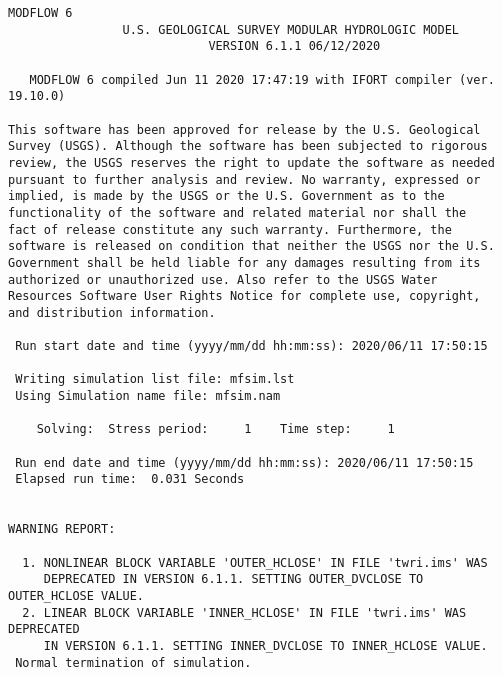 {\small
\begin{lstlisting}[style=modeloutput]
                                   MODFLOW 6
                U.S. GEOLOGICAL SURVEY MODULAR HYDROLOGIC MODEL
                            VERSION 6.1.1 06/12/2020

   MODFLOW 6 compiled Jun 11 2020 17:47:19 with IFORT compiler (ver. 19.10.0)

This software has been approved for release by the U.S. Geological
Survey (USGS). Although the software has been subjected to rigorous
review, the USGS reserves the right to update the software as needed
pursuant to further analysis and review. No warranty, expressed or
implied, is made by the USGS or the U.S. Government as to the
functionality of the software and related material nor shall the
fact of release constitute any such warranty. Furthermore, the
software is released on condition that neither the USGS nor the U.S.
Government shall be held liable for any damages resulting from its
authorized or unauthorized use. Also refer to the USGS Water
Resources Software User Rights Notice for complete use, copyright,
and distribution information.

 Run start date and time (yyyy/mm/dd hh:mm:ss): 2020/06/11 17:50:15

 Writing simulation list file: mfsim.lst
 Using Simulation name file: mfsim.nam

    Solving:  Stress period:     1    Time step:     1

 Run end date and time (yyyy/mm/dd hh:mm:ss): 2020/06/11 17:50:15
 Elapsed run time:  0.031 Seconds


WARNING REPORT:

  1. NONLINEAR BLOCK VARIABLE 'OUTER_HCLOSE' IN FILE 'twri.ims' WAS
     DEPRECATED IN VERSION 6.1.1. SETTING OUTER_DVCLOSE TO OUTER_HCLOSE VALUE.
  2. LINEAR BLOCK VARIABLE 'INNER_HCLOSE' IN FILE 'twri.ims' WAS DEPRECATED
     IN VERSION 6.1.1. SETTING INNER_DVCLOSE TO INNER_HCLOSE VALUE.
 Normal termination of simulation.

\end{lstlisting}
}
